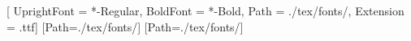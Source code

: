 \usepackage{fontspec}

\newfontfamily{}[
    UprightFont = *-Regular,
    BoldFont = *-Bold,
    Path = ./tex/fonts/,
    Extension = .ttf]
\newfontface{}[Path=./tex/fonts/]
\newfontface{}[Path=./tex/fonts/]

